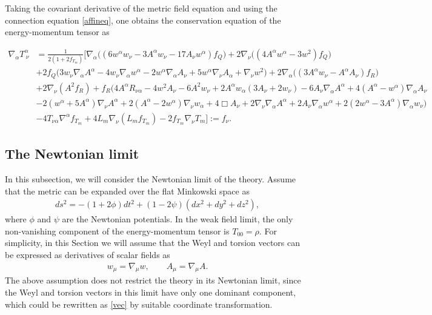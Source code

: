 \documentclass[aps,superscriptaddress, showpacs,preprintnumbers, superscriptaddress, nofootinbibt,twocolumn]{revtex4}
\newcommand{\f}[2]{\frac{#1}{#2}}
\begin{document}
Taking the covariant derivative of the metric field equation and using the connection equation \eqref{affineq}, one obtains the conservation equation of the energy-momentum tensor as
\begin{widetext}
\begin{align}\label{cons}
\nabla_\alpha T^\alpha_{~\nu}&=\f{1}{2(1+2f_{T_m})}\Bigg[\nabla_\alpha\Big((6w^\alpha w_\nu-3A^\alpha w_\nu-17A_\nu w^\alpha)f_Q\Big)+2\nabla_\nu\Big((4A^\alpha w^\alpha-3w^2)f_Q\Big)\nonumber\\&+2f_Q\Big(3w_\nu\nabla_\alpha A^\alpha-4w_\nu\nabla_\alpha w^\alpha-2w^\alpha\nabla_\alpha A_\nu+5w^\alpha \nabla_\nu A_\alpha+\nabla_\nu w^2\Big)+2\nabla_\alpha\Big((3A^\alpha w_\nu-A^\alpha A_\nu)f_R\Big)\nonumber\\&+2\nabla_\nu(A^2f_R)+f_R\Big(4A^\alpha R_{\nu\alpha}-4w^2 A_\nu-6A^2w_\nu+2A^\alpha w_\alpha(3A_\nu+2w_\nu)-6A_\nu \nabla_\alpha A^\alpha+4(A^\alpha-w^\alpha)\nabla_\alpha A_\nu\nonumber\\&-2(w^\alpha+5A^\alpha)\nabla_\nu A^\alpha+2(A^\alpha-2w^\alpha)\nabla_\nu w_\alpha+4\Box A_\nu+2\nabla_\nu\nabla_\alpha A^\alpha+2A_\nu\nabla_\alpha w^\alpha+2(2w^\alpha-3A^\alpha)\nabla_\alpha w_\nu\Big)\nonumber\\&-4T_{\nu\alpha}\nabla^\alpha f_{T_m}+4L_m\nabla_\nu (L_mf_{T_m})-2f_{T_m}\nabla_\nu T_m\Bigg]:=f_{\nu}.
\end{align}
\end{widetext}

\subsection{The Newtonian limit}

In this subsection, we will consider the Newtonian limit of the theory. Assume that the metric can be expanded over the flat Minkowski space as
\begin{align}
ds^2=-(1+2\phi)dt^2+(1-2\psi)(dx^2+dy^2+dz^2),
\end{align}
where $\phi$ and $\psi$ are the Newtonian potentials. In the weak field limit, the only non-vanishing component of the energy-momentum tensor is $T_{00}=\rho$. For simplicity, in this Section we will assume that the Weyl and torsion vectors can be expressed as derivatives of scalar fields as
\begin{align}\label{vec}
w_\mu=\nabla_\mu w,\qquad A_\mu=\nabla_\mu A.
\end{align}
The above assumption does not restrict the theory in its Newtonian limit, since the Weyl and torsion vectors in this limit have only one dominant component, which could be rewritten as \eqref{vec} by suitable coordinate transformation.
\end{document}
